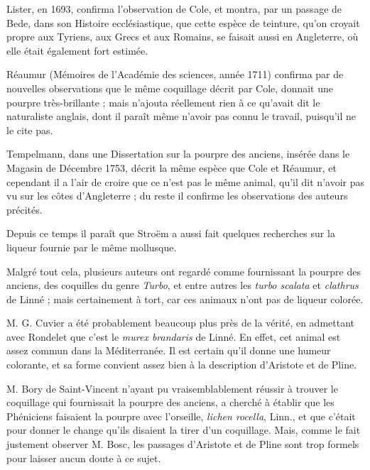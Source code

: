 \documentclass[a4paper, 11pt, oneside, polutonikogreek, french]{article}
\begin{document}
Lister, en 1693, confirma l'observation de Cole, et montra, par un passage de Bede, dans son Histoire ecclésiastique, que cette espèce de teinture, qu'on croyait propre aux Tyriens, aux Grecs et aux Romains, se faisait aussi en Angleterre, où elle était également fort estimée.

Réaumur (Mémoires de l'Académie des sciences, année 1711) confirma par de nouvelles observations que le même coquillage décrit par Cole, donnait une pourpre très-brillante ; mais n'ajouta réellement rien à ce qu'avait dit le naturaliste anglais, dont il paraît même n'avoir pas connu le travail, puisqu'il ne le cite pas.

Tempelmann, dans une Dissertation sur la pourpre des anciens, insérée dans le Magasin de Décembre 1753, décrit la même espèce que Cole et Réaumur, et cependant il a l'air de croire que ce n'est pas le même animal, qu'il dit n'avoir pas vu sur les côtes d'Angleterre ; du reste il confirme les observations des auteurs précités.

Depuis ce temps il paraît que Stroëm a aussi fait quelques recherches sur la liqueur fournie par le même mollusque.

Malgré tout cela, plusieurs auteurs ont regardé comme fournissant la pourpre des anciens, des coquilles du genre \emph{Turbo}, et entre autres les \emph{turbo scalata} et \emph{clathrus} de Linné ; mais certainement à tort, car ces animaux n'ont pas de liqueur colorée.

M. G. Cuvier a été probablement beaucoup plus près de la vérité, en admettant avec Rondelet que c'est le \emph{murex brandaris} de Linné. En effet, cet animal est assez commun dans la Méditerranée. Il est certain qu'il donne une humeur colorante, et sa forme convient assez bien à la description d'Aristote et de Pline.

M. Bory de Saint-Vincent n'ayant pu vraisemblablement réussir à trouver le coquillage qui fournissait la pourpre des anciens, a cherché à établir que les Phéniciens faisaient la pourpre avec l'orseille, \emph{lichen rocella}, Linn., et que c'était pour donner le change qu'ils disaient la tirer d'un coquillage. Mais, comme le fait justement observer M. Bosc, les passages d'Aristote et de Pline sont trop formels pour laisser aucun doute à ce sujet.
\end{document}
